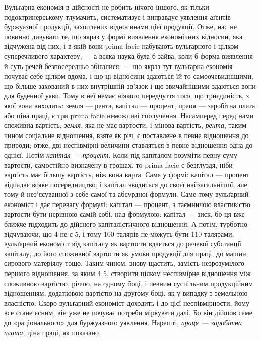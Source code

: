Вульґарна економія в дійсності не робить нічого іншого, як тільки подоктринерському
тлумачить, систематизує і виправдує уявлення аґентів буржуазної
продукції, захоплених відносинами цієї продукції. Отже, нас не повинно
дивувати те, що якраз у формі виявлення економічних відносин, яка відчужена
від них, і в якій вони prima facie набувають вульґарного і цілком суперечливого
характеру, — а всяка наука була б зайва, коли б форма виявлення й суть
речей безпосередньо збігалися, — що якраз тут вульґарна економія почуває себе
цілком вдома, і що ці відносини здаються їй то самоочевиднішими, що більше
захований в них внутрішній зв’язок і що звичайнішими здаються вони для
буденної уяви. Тому в неї немає ніякого передчуття того, що триєдиність,
з якої вона виходить: земля — рента, капітал — процент, праця — заробітна плата
або ціна праці, є три prima facie неможливі сполучення. Насамперед перед
нами споживна вартість, \emph{земля}, яка не має вартости, і мінова вартість, \emph{рента},
таким чином соціальне відношення, взяте як річ, є поставлене в певне
відношення до природи; отже, дві неспівмірні величини ставляться в певне
відношення одна до однієї. Потім \emph{капітал — процент}. Коли під капіталом
розуміти певну суму вартости, самостійно визначену в грошах, то prima facie
є безглуздя, ніби вартість має більшу вартість, ніж вона варта. Саме у формі:
капітал — процент відпадає всяке посередництво, і капітал зводиться до своєї
найзагальнішої, але тому й нез’ясуванної з себе самої та абсурдної формули.
Саме тому вульґарний економіст і дає перевагу формулі: капітал — процент,
з таємничою властивістю вартости бути нерівною самій собі, над формулою:
капітал — зиск, бо ця вже ближче підходить до дійсного капіталістичного відношення.
А потім, турботно відчуваючи, що 4 не є 5, і тому 100 талярів не
можуть бути 110 талярами, вульґарний економіст від капіталу як вартости
вдається до речевої субстанції капіталу, до його споживної вартости як умови
продукції для праці, до машин, сирового матеріялу тощо. Таким чином, знову
щастить, замість незрозумілого першого відношення, за яким 4 \deq{} 5, створити
цілком неспівмірне відношення між споживною вартістю, річчю, на одному боці,
і певним суспільним продукційним відношенням, додатковою вартістю на другому
боці, як у випадку з земельною власністю. Скоро вульґарний економіст
доходить і до цієї неспівмірности, йому все стане ясним, він уже не почуває
потреби міркувати далі. Бо він дійшов саме до «раціонального» для буржуазного
уявлення. Нарешті, \emph{праця — заробітна плата}, ціна праці, як показано
\parbreak{}  %
